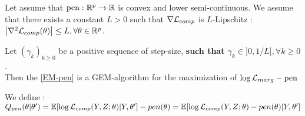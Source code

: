 \documentclass[a4paper]{article}
\renewcommand{\varobs}{Y}
\begin{document}
\begin{myText}


\begin{prop}\label{prox_arrival}
    Let assume that $\mathrm{pen} : \mathbb R^p \rightarrow \mathbb R$ is convex and lower semi-continuous. We assume that there exists a constant $L>0$ such that $\nabla\mathcal L_{comp}$ is $L$-Lipschitz  : $\left\vert \nabla^2\mathcal L_{comp}(\theta) \right\vert \leq L,\forall \theta\in\mathbb R^p$.

    Let $(\gamma_k)_{k\geq 0}$  be a positive sequence of step-size, \textbf{such that $\gamma_k\in ]0,1/L ], \forall k\geq 0$}.
    \\Then the \autoref{EM-pen} is a GEM-algorithm for the maximization of $\log\mathcal L_{marg} - \mathrm{pen}$
\end{prop}

\begin{dem}
    
\end{dem}

We define : $Q_{pen}(\theta|\theta') = \mbb E[\log\Lcomp(\varobs,\varlat;\theta) | \varobs,\theta']  - pen (\theta)=
 \mbb E[\log\Lcomp(\varobs,\varlat;\theta)  - pen (\theta) | \varobs,\theta']$



\end{myText}
\end{document}
